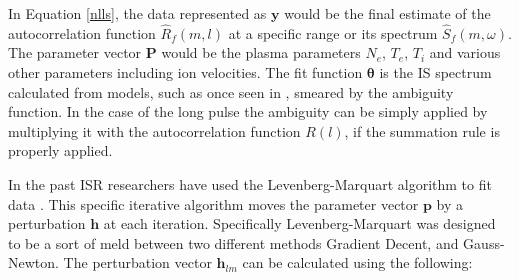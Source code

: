 \documentclass[draft,ras]{agutex}
\begin{document}
\begin{article}
In Equation \ref{nlls}, the data represented as $\mathbf{y}$ would be the final estimate of the autocorrelation function $\hat{R}_f(m,l)$ at a specific range or its spectrum $\hat{S}_f(m,\omega)$.  The parameter vector $\mathbf{P}$ would be the plasma parameters $N_e$, $T_e$, $T_i$ and various other parameters including ion velocities. The fit function $\bm{\theta}$ is the IS spectrum calculated from models, such as once seen in \citep{kudeki:milla:1}, smeared by the ambiguity function.  In the case of the long pulse the ambiguity can be simply applied by multiplying it with the autocorrelation function $R(l)$, if the summation rule is properly applied. 

%
%






In the past ISR researchers have used the Levenberg-Marquart algorithm to fit data \citep{nikoukar2008}.  This specific iterative algorithm moves the parameter vector $\mathbf{p}$ by a perturbation $\mathbf{h}$ at each iteration\citep{gavin:2013}.  Specifically Levenberg-Marquart was designed to be a sort of meld between two different methods Gradient Decent, and Gauss-Newton.  The perturbation vector $\mathbf{h}_{lm}$ can be calculated using the following:


\end{article}
\end{document}
